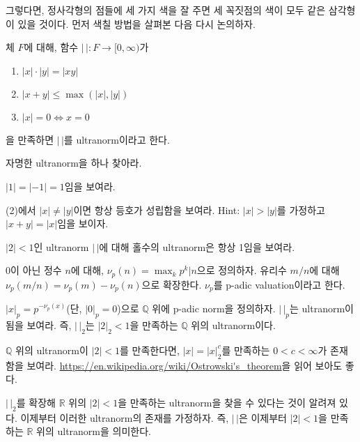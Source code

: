 그렇다면, 정사각형의 점들에 세 가지 색을 잘 주면 세 꼭짓점의 색이 모두 같은 삼각형이 있을 것이다. 먼저 색칠 방법을 살펴본 다음 다시 논의하자. 
\begin{definition}
    체 $F$에 대해, 함수 $|\,|:F\to [0, \infty)$가
    \begin{enumerate}[(1)]
        \item $|x|\cdot|y|=|xy|$
        \item $|x+y|\leq \max(|x|,|y|)$
        \item $|x|=0\iff x=0$
    \end{enumerate}
    을 만족하면 $|\,|$를 ultranorm이라고 한다. 
\end{definition}
\begin{exercise}
    자명한 ultranorm을 하나 찾아라. 
\end{exercise}
\begin{exercise}
    $|1|=|-1|=1$임을 보여라. 
\end{exercise}
\begin{exercise}
    (2)에서 $|x|\neq |y|$이면 항상 등호가 성립함을 보여라. Hint: $|x|>|y|$를 가정하고 $|x+y|=|x|$임을 보이자. 
\end{exercise}
\begin{exercise}
    $|2|<1$인 ultranorm $|\,|$에 대해 홀수의 ultranorm은 항상 1임을 보여라. 
\end{exercise}
\begin{definition}
    0이 아닌 정수 $n$에 대해, $\nu_p(n)=\max_k p^k|n$으로 정의하자. 유리수 $m/n$에 대해 $\nu_p(m/n)=\nu_p(m)-\nu_p(n)$으로 확장한다. $\nu_p$를 p-adic valuation이라고 한다. 
\end{definition}
\begin{exercise}
    $|x|_p=p^{-\nu_p(x)}$(단, $|0|_p=0$)으로 $\mathbb{Q}$ 위에 p-adic norm을 정의하자. $|\,|_p$는 ultranorm이 됨을 보여라. 즉, $|\,|_2$는 $|2|_2<1$을 만족하는 $\mathbb{Q}$ 위의 ultranorm이다. 
\end{exercise}
\begin{exercise}
    $\mathbb{Q}$ 위의 ultranorm이 $|2|<1$를 만족한다면, $|x|=|x|_2^c$를 만족하는 $0<c<\infty$가 존재함을 보여라. \url{https://en.wikipedia.org/wiki/Ostrowski's_theorem}을 읽어 보아도 좋다. 
\end{exercise}
\begin{remark}
    $|\,|_2$를 확장해 $\mathbb{R}$ 위의 $|2|<1$을 만족하는 ultranorm을 찾을 수 있다는 것이 알려져 있다. 이제부터 이러한 ultranorm의 존재를 가정하자. 즉, $|\,|$은 이제부터 $|2|<1$을 만족하는 $\mathbb{R}$ 위의 ultranorm을 의미한다. 
\end{remark}
